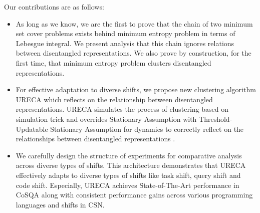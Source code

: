 Our contributions  are as follows: 
\begin{itemize}
    \item As long as we know, we are the first to prove that the chain of two minimum set cover problems 
          exists behind minimum entropy problem in terms of Lebesgue integral.
          We present analysis that this chain ignores relations between disentangled representations.
          We also prove by construction, for the first time, 
          that minimum entropy problem clusters disentangled representations. 
          
    \item For effective adaptation to diverse shifts,
          we propose new clustering algorithm URECA which reflects on the relationship 
          between disentangled representations.
          URECA simulates the process of clustering based on simulation trick and 
          overrides Stationary Assumption with Threshold-Updatable Stationary 
          Assumption for dynamics to correctly reflect on
          the relationships between disentangled representations .           
    \item We carefully design the structure of experiments for comparative analysis across diverse 
          types of shifts. 
          This architecture demonstrates that URECA effectively adapts to diverse types of shifts
          like task shift, query shift and code shift. 
          Especially, URECA achieves State-of-The-Art performance in CoSQA 
          along with consistent performance gains across various programming languages 
          and shifts in CSN. 
\end{itemize}


